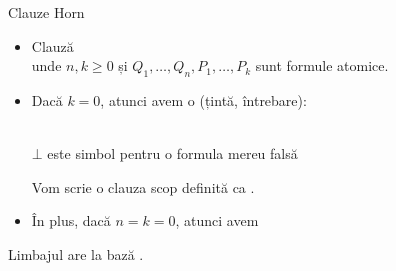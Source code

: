 \documentclass[xcolor=pdftex,romanian,colorlinks]{beamer}
\begin{document}

\begin{frame}{Clauze Horn}


\begin{itemize}

\item Clauză  \\
unde $n,k\geq 0$ și  $Q_1,\ldots, Q_n,P_1,\ldots, P_k$ sunt formule atomice.

\bigskip
\item Dacă $k=0$, atunci avem o  (țintă, întrebare):
\begin{center}
	 \\
	$\bot$ este simbol pentru o formula mereu falsă
\end{center}
Vom scrie o clauza scop definită ca . 
\bigskip
\item În plus, dacă $n=k=0$, atunci avem  \intens{$\Box$}


\end{itemize}

\begin{center}
\end{center}


\begin{center}

Limbajul  are la bază .

\end{center}
\end{frame}

\end{document}
